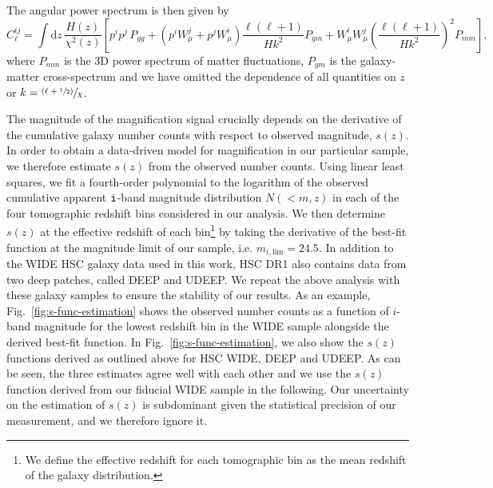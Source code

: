 \documentclass[a4paper,11pt]{article}
\begin{document}
    The angular power spectrum is then given by
    \begin{equation}\label{eq:cell_gg_wmag}
      C^{ij}_\ell = \int \mathrm{d}z\,\frac{H(z)}{\chi^2(z)}\left[p^ip^j\,P_{gg}+\left(p^iW_\mu^j+p^jW_\mu^i\right)\frac{\ell(\ell+1)}{Hk^2}P_{gm}+W_\mu^iW_\mu^j\left(\frac{\ell(\ell+1)}{Hk^2}\right)^2P_{mm}\right],
    \end{equation}
    where $P_{mm}$ is the 3D power spectrum of matter fluctuations, $P_{gm}$ is the galaxy-matter cross-spectrum and we have omitted the dependence of all quantities on $z$ or $k=\sfrac{(\ell+\sfrac{1}{2})}{\chi}$.

    The magnitude of the magnification signal crucially depends on the derivative of the cumulative galaxy number counts with respect to observed magnitude, $s(z)$. In order to obtain a data-driven model for magnification in our particular sample, we therefore estimate $s(z)$ from the observed number counts. Using linear least squares, we fit a fourth-order polynomial to the logarithm of the observed cumulative apparent $\tt{i}$-band magnitude distribution $N(<m, z)$ in each of the four tomographic redshift bins considered in our analysis. We then determine $s(z)$ at the effective redshift of each bin\footnote{We define the effective redshift for each tomographic bin as the mean redshift of the galaxy distribution.} by taking the derivative of the best-fit function at the magnitude limit of our sample, i.e. $m_{i, \mathrm{lim}} = 24.5$. In addition to the WIDE HSC galaxy data used in this work, HSC DR1 also contains data from two deep patches, called DEEP and UDEEP. We repeat the above analysis with these galaxy samples to ensure the stability of our results. As an example, Fig.~\ref{fig:s-func-estimation} shows the observed number counts as a function of $i$-band magnitude for the lowest redshift bin in the WIDE sample alongside the derived best-fit function. In Fig.~\ref{fig:s-func-estimation}, we also show the $s(z)$ functions derived as outlined above for HSC WIDE, DEEP and UDEEP. As can be seen, the three estimates agree well with each other and we use the $s(z)$ function derived from our fiducial WIDE sample in the following. Our uncertainty on the estimation of $s(z)$ is subdominant given the statistical precision of our measurement, and we therefore ignore it.
\end{document}
